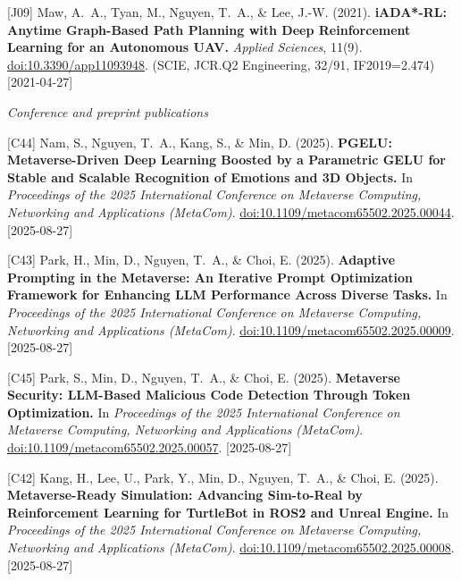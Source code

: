 {\begin{pubenumerate}
\item {\color{blue}[J09]} Maw, A.\ A., Tyan, M., Nguyen, T.\ A., \& Lee, J.-W. (2021). \textbf{iADA*-RL: Anytime Graph-Based Path Planning with Deep Reinforcement Learning for an Autonomous UAV.} \textit{Applied Sciences}, 11(9). \href{https://doi.org/10.3390/app11093948}{doi:10.3390/app11093948}. (SCIE, JCR.Q2 Engineering, 32/91, IF2019=2.474) [2021-04-27]

\end{pubenumerate}

\textit{Conference and preprint publications}
\begin{pubenumerate}

  \item {\color{green}[C44]} Nam, S., Nguyen, T.\ A., Kang, S., \& Min, D. (2025). 
  \textbf{PGELU: Metaverse-Driven Deep Learning Boosted by a Parametric GELU for Stable and Scalable Recognition of Emotions and 3D Objects.} 
  In \textit{Proceedings of the 2025 International Conference on Metaverse Computing, Networking and Applications (MetaCom)}. 
  \href{https://doi.org/10.1109/metacom65502.2025.00044}{doi:10.1109/metacom65502.2025.00044}. [2025-08-27]

\item {\color{green}[C43]} Park, H., Min, D., Nguyen, T.\ A., \& Choi, E. (2025). 
  \textbf{Adaptive Prompting in the Metaverse: An Iterative Prompt Optimization Framework for Enhancing LLM Performance Across Diverse Tasks.} 
  In \textit{Proceedings of the 2025 International Conference on Metaverse Computing, Networking and Applications (MetaCom)}. 
  \href{https://doi.org/10.1109/metacom65502.2025.00009}{doi:10.1109/metacom65502.2025.00009}. [2025-08-27]

\item {\color{green}[C45]} Park, S., Min, D., Nguyen, T.\ A., \& Choi, E. (2025). 
  \textbf{Metaverse Security: LLM-Based Malicious Code Detection Through Token Optimization.} 
  In \textit{Proceedings of the 2025 International Conference on Metaverse Computing, Networking and Applications (MetaCom)}. 
  \href{https://doi.org/10.1109/metacom65502.2025.00057}{doi:10.1109/metacom65502.2025.00057}. [2025-08-27]

\item {\color{green}[C42]} Kang, H., Lee, U., Park, Y., Min, D., Nguyen, T.\ A., \& Choi, E. (2025). 
  \textbf{Metaverse-Ready Simulation: Advancing Sim-to-Real by Reinforcement Learning for TurtleBot in ROS2 and Unreal Engine.} 
  In \textit{Proceedings of the 2025 International Conference on Metaverse Computing, Networking and Applications (MetaCom)}. 
  \href{https://doi.org/10.1109/metacom65502.2025.00008}{doi:10.1109/metacom65502.2025.00008}. [2025-08-27]


\end{pubenumerate}}
